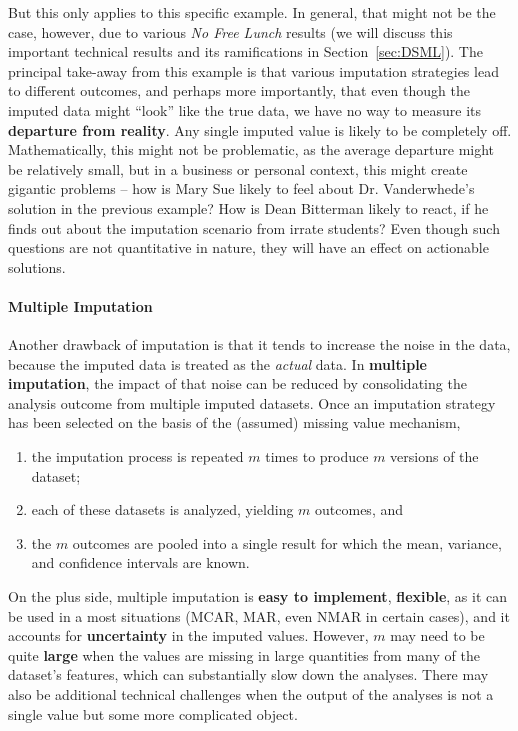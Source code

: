 \newpage\noindent
But this only applies to this specific example. In general, that might not be the case, however, due to various \textit{No Free Lunch} results (we will discuss this important technical results and its ramifications in Section~\ref{sec:DSML}). The principal take-away from this example is that various imputation strategies lead to different outcomes, and perhaps more importantly, that even though the imputed data might ``look'' like the true data, we have no way to measure its \textbf{departure from reality}. Any single imputed value is likely to be completely off. Mathematically, this might not be problematic, as the average departure might be relatively small, but in a business or personal context, this might create gigantic problems  -- how is Mary Sue likely to feel about Dr. Vanderwhede's solution in the previous example? How is Dean Bitterman likely to react, if he finds out about the imputation scenario from irrate students? Even though such questions are not quantitative in nature, they will have an effect on actionable solutions.  
\paragraph{Multiple Imputation}
Another drawback of imputation is that it tends to increase the noise in the data, because the imputed data is treated as the \textit{actual} data. In \textbf{multiple imputation}, the impact of that noise can be reduced by consolidating the analysis outcome from multiple imputed datasets. Once an imputation strategy has been selected on the basis of the (assumed) missing value mechanism, 
\begin{enumerate}[noitemsep]
\item the imputation process is repeated $m$ times to produce $m$ versions of the dataset;
\item each of these datasets is analyzed, yielding $m$ outcomes, and  
\item the $m$ outcomes are pooled into a single result for which the mean, variance, and confidence intervals are known.
\end{enumerate}
On the plus side, multiple imputation is \textbf{easy to implement}, \textbf{flexible}, as it can  be used in a most situations (MCAR, MAR, even NMAR in certain cases), and it accounts for \textbf{uncertainty} in the imputed values. However, $m$ may need to be quite \textbf{large} when the values are missing in large quantities from many of the dataset's features, which can substantially slow down the analyses. There may also be additional technical challenges when the output of the analyses is not a single value but some more complicated object.

